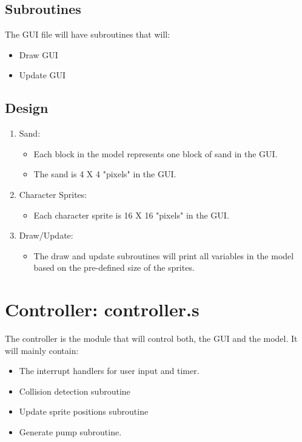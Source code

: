 \subsection{Subroutines}

The GUI file will have subroutines that will:

\begin{itemize}
  \item Draw GUI
  \item Update GUI
\end{itemize}

\subsection{Design}

\begin{enumerate}

  \item Sand:
  \begin{itemize}
    \item Each block in the model represents one block of sand in the GUI.
    \item The sand is 4 X 4 "pixels" in the GUI.
  \end{itemize}
  
  \item Character Sprites:
  \begin{itemize}
    \item Each character sprite is 16 X 16 "pixels" in the GUI.
  \end{itemize}
  
  \item Draw/Update:
  \begin{itemize}
    \item The draw and update subroutines will print all variables in the model based on the pre-defined size of the sprites.
  \end{itemize}

\end{enumerate}

\section{Controller: controller.s}

The controller is the module that will control both, the GUI and the model.
It will mainly contain:

\begin{itemize}
  \item The interrupt handlers for user input and timer.
  \item Collision detection subroutine
  \item Update sprite positions subroutine
  \item Generate pump subroutine.
\end{itemize}

